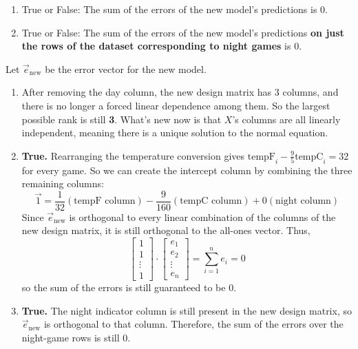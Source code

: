 \documentclass[11pt]{article}
\begin{document}
\begin{prob}[(20 pts)]
\begin{subprob}
\begin{enumerate}[label=(\roman*)]
    \item True or False: The sum of the errors of the new model's predictions is 0.
    
     

    \item True or False: The sum of the errors of the new model's predictions \textbf{on just the rows of the dataset corresponding to night games} is 0.
    
     

\end{enumerate}
\begin{solution}
Let $\vec e_{\text{new}}$ be the error vector for the new model.

\begin{enumerate}[label=(\roman*)]
    \item After removing the day column, the new design matrix has 3 columns, and there is no longer a forced linear dependence among them. So the largest possible rank is still \textbf{3}. What's new now is that $X$'s columns are all linearly independent, meaning there is a unique solution to the normal equation.

    \item \textbf{True.} Rearranging the temperature conversion gives $\text{tempF}_i - \frac{9}{5}\text{tempC}_i = 32$ for every game. So we can create the intercept column by combining the three remaining columns:
    \[
    \vec 1 = \frac{1}{32}(\text{tempF column}) - \frac{9}{160}(\text{tempC column}) + 0(\text{night column})
    \]
    Since $\vec e_{\text{new}}$ is orthogonal to every linear combination of the columns of the new design matrix, it is still orthogonal to the all-ones vector. Thus,
    \[
    \begin{bmatrix} 1 \\ 1 \\ \vdots \\ 1 \end{bmatrix} \cdot
    \begin{bmatrix} e_1 \\ e_2 \\ \vdots \\ e_n \end{bmatrix}
    = \sum_{i=1}^n e_i = 0
    \]
    so the sum of the errors is still guaranteed to be 0.

    \item \textbf{True.} The night indicator column is still present in the new design matrix, so $\vec e_{\text{new}}$ is orthogonal to that column. Therefore, the sum of the errors over the night-game rows is still 0.
\end{enumerate}
\end{solution}
\end{subprob}

\end{prob}
\end{document}
